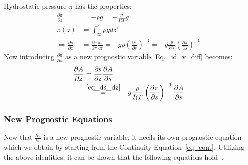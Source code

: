 \noindent
Hydrostatic pressure $\pi$ has the properties:
\begin{align}
\frac{\partial \pi}{\partial z} &= -\rho g = - \frac{p}{RT}g \nonumber \\
\pi(z) &= \int_\infty ^z \rho g dz' \nonumber \\
\Rightarrow \frac{\partial s}{\partial z} &= \frac{\partial s}{\partial \pi}\frac{\partial \pi}{\partial z} = - g\rho\left(\frac{\partial \pi}{\partial s}\right)^{-1} = - g\frac{p}{RT}\left(\frac{\partial \pi}{\partial s}\right)^{-1} \label{eq_ds_dz}
\end{align}
Now introducing $\frac{\partial \pi}{\partial s}$ as a new prognostic variable, Eq.~\ref{id_v_diff} becomes:
\begin{align}
\frac{\partial A}{\partial z} &= \frac{\partial s}{\partial z} \frac{\partial A}{\partial s}\nonumber\\
&\stackrel{\ref{eq_ds_dz}}{=} - g\frac{p}{RT}\left(\frac{\partial \pi}{\partial s}\right)^{-1}\frac{\partial A}{\partial s}\label{id_v_diff2}
\end{align}

\subsubsection{New Prognostic Equations}
Now that $\frac{\partial \pi}{\partial s}$ is a new prognostic variable, it needs its own prognostic equation which we obtain by starting from the Continuity Equation~\ref{eq_cont}.
Utilizing the above identities, it can be shown that the following equations hold~\cite{coiffier2011fundamentals}.

